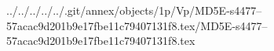 ../../../../../.git/annex/objects/1p/Vp/MD5E-s4477--57acac9d201b9e17fbe11c79407131f8.tex/MD5E-s4477--57acac9d201b9e17fbe11c79407131f8.tex